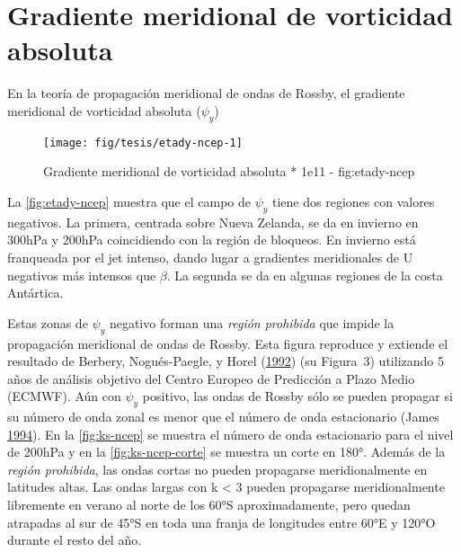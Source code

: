 \documentclass[spanish,a4paper]{book}
\begin{document}
\section{Gradiente meridional de vorticidad
absoluta}\label{gradiente-meridional-de-vorticidad-absoluta}

En la teoría de propagación meridional de ondas de Rossby, el gradiente
meridional de vorticidad absoluta (\(\psi_y\))

\begin{landscape}\begin{figure}

{\centering \texttt{[image: fig/tesis/etady-ncep-1]} 

}

\caption{Gradiente meridional de vorticidad absoluta * 1e11 - fig:etady-ncep}\label{fig:etady-ncep}
\end{figure}
\end{landscape}

La \autoref{fig:etady-ncep} muestra que el campo de \(\psi_y\) tiene dos
regiones con valores negativos. La primera, centrada sobre Nueva
Zelanda, se da en invierno en 300hPa y 200hPa coincidiendo con la región
de bloqueos. En invierno está franqueada por el jet intenso, dando lugar
a gradientes meridionales de U negativos más intensos que \(\beta\). La
segunda se da en algunas regiones de la costa Antártica.

Estas zonas de \(\psi_y\) negativo forman una \emph{región prohibida}
que impide la propagación meridional de ondas de Rossby. Esta figura
reproduce y extiende el resultado de Berbery, Nogués-Paegle, y Horel
(\protect\hyperlink{ref-Berbery1992}{1992}) (su Figura~3) utilizando 5
años de análisis objetivo del Centro Europeo de Predicción a Plazo Medio
(ECMWF). Aún con \(\psi_y\) positivo, las ondas de Rossby sólo se pueden
propagar si su número de onda zonal es menor que el número de onda
estacionario (James \protect\hyperlink{ref-James}{1994}). En la
\autoref{fig:ks-ncep} se muestra el número de onda estacionario para el
nivel de 200hPa y en la \autoref{fig:ks-ncep-corte} se muestra un corte
en 180°. Además de la \emph{región prohibida}, las ondas cortas no
pueden propagarse meridionalmente en latitudes altas. Las ondas largas
con k \textless{} 3 pueden propagarse meridionalmente libremente en
verano al norte de los 60°S aproximadamente, pero quedan atrapadas al
sur de 45°S en toda una franja de longitudes entre 60°E y 120°O durante
el resto del año.
\end{document}
